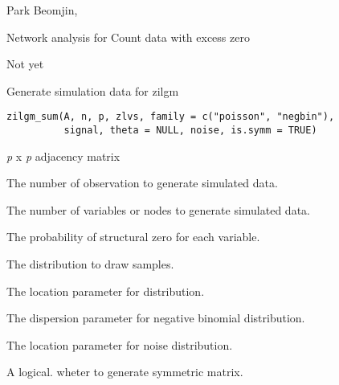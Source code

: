 \documentclass[a4paper]{book}
\begin{document}
%
\begin{Author}\relax
Park Beomjin, 
\end{Author}
%
\begin{References}\relax
Network analysis for Count data with excess zero
\end{References}
%
\begin{Examples}
\begin{ExampleCode}
Not yet
\end{ExampleCode}
\end{Examples}
%
\begin{Description}\relax
Generate simulation data for zilgm
\end{Description}
%
\begin{Usage}
\begin{verbatim}
zilgm_sum(A, n, p, zlvs, family = c("poisson", "negbin"),
          signal, theta = NULL, noise, is.symm = TRUE)
\end{verbatim}
\end{Usage}
%
\begin{Arguments}
\begin{ldescription}
\item[\code{A}] 
\emph{p} x \emph{p} adjacency matrix

\item[\code{n}] 
The number of observation to generate simulated data.

\item[\code{p}] 
The number of variables or nodes to generate simulated data.

\item[\code{zlvs}] 
The probability of structural zero for each variable.

\item[\code{family}] 
The distribution to draw samples.

\item[\code{signal}] 
The location parameter for distribution.

\item[\code{theta}] 
The dispersion parameter for negative binomial distribution.

\item[\code{noise}] 
The location parameter for noise distribution.

\item[\code{is.symm}] 
A logical. wheter to generate symmetric matrix.

\end{ldescription}
\end{Arguments}
\end{document}
